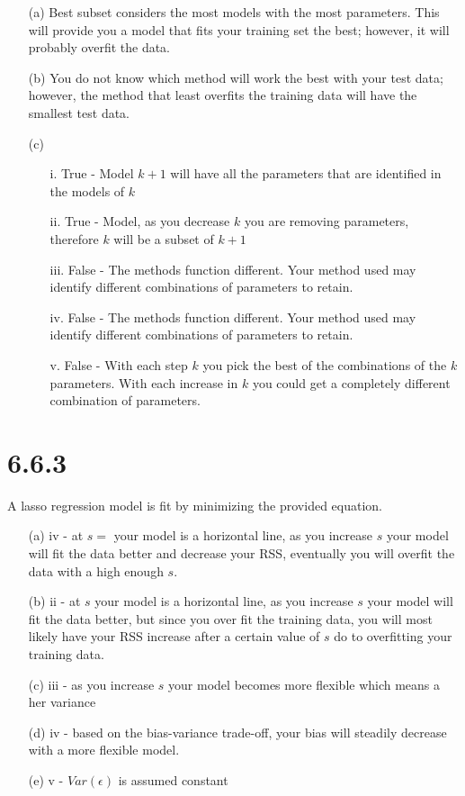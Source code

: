 \documentclass[12pt]{article}
\begin{document}
\begin{enumerate}
    \item[(a)] Best subset considers the most models with the most parameters. This will provide you a model that fits your training set the best; however, it will probably overfit the data.
    \item[(b)] You do not know which method will work the best with your test data; however, the method that least overfits the training data will have the smallest test data.
    \item[(c)]
    \begin{enumerate}
        \item[i.] True - Model $k+1$ will have all the parameters that are identified in the models of $k$
        \item[ii.] True - Model, as you decrease $k$ you are removing parameters, therefore $k$ will be a subset of $k+1$
        \item[iii.] False - The methods function different. Your method used may identify different combinations of parameters to retain.
        \item[iv.] False - The methods function different. Your method used may identify different combinations of parameters to retain.
        \item[v.] False - With each step $k$ you pick the best of the combinations of the $k$ parameters. With each increase in $k$ you could get a completely different combination of parameters.
    \end{enumerate}
\end{enumerate}

\section*{6.6.3}
A lasso regression model is fit by minimizing the provided equation.

\begin{enumerate}
    \item[(a)] iv - at $s=$ your model is a horizontal line, as you increase $s$ your model will fit the data better and decrease your RSS, eventually you will overfit the data with a high enough $s$. 
    \item[(b)] ii - at $s$ your model is a horizontal line, as you increase $s$ your model will fit the data better, but since you over fit the training data, you will most likely have your RSS increase after a certain value of $s$ do to overfitting your training data.
    \item[(c)] iii - as you increase $s$ your model becomes more flexible which means a her variance
    \item[(d)] iv - based on the bias-variance trade-off, your bias will steadily decrease with a more flexible model.
    \item[(e)] v - $Var(\epsilon)$ is assumed constant
\end{enumerate}
\end{document}
